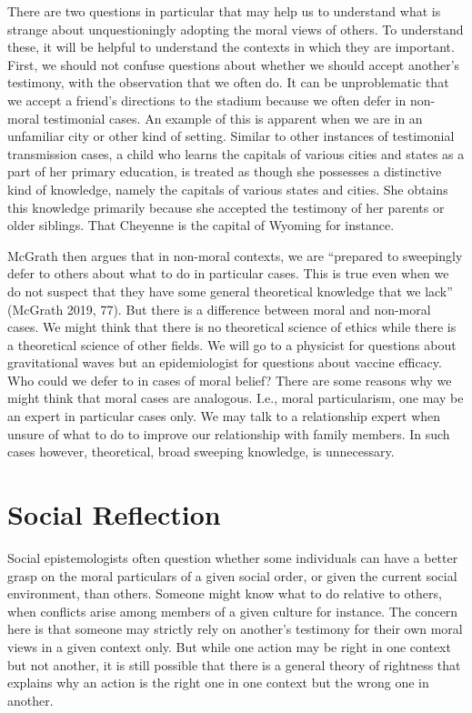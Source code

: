 \documentclass[12pt]{book}
\theoremstyle{definition}
\theoremstyle{remark}
\begin{document}
There are two questions in particular that may help us to understand what is strange about unquestioningly adopting the moral views of others. To understand these, it will be helpful to understand the contexts in which they are important. First, we should not confuse questions about whether we should accept another's testimony, with the observation that we often do. It can be unproblematic that we accept a friend's directions to the stadium because we often defer in non-moral testimonial cases. An example of this is apparent when we are in an unfamiliar city or other kind of setting. Similar to other instances of testimonial transmission cases, a child who learns the capitals of various cities and states as a part of her primary education, is treated as though she possesses a distinctive kind of knowledge, namely the capitals of various states and cities. She obtains this knowledge primarily because she accepted the testimony of her parents or older siblings. That Cheyenne is the capital of Wyoming for instance.

McGrath then argues that in non-moral contexts, we are ``prepared to sweepingly defer to others about what to do in particular cases. This is true even when we do not suspect that they have some general theoretical knowledge that we lack'' (McGrath 2019, 77). But there is a difference between moral and non-moral cases. We might think that there is no theoretical science of ethics while there is a theoretical science of other fields. We will go to a physicist for questions about gravitational waves but an epidemiologist for questions about vaccine efficacy. Who could we defer to in cases of moral belief? There are some reasons why we might think that moral cases are analogous. I.e., moral particularism, one may be an expert in particular cases only. We may talk to a relationship expert when unsure of what to do to improve our relationship with family members. In such cases however, theoretical, broad sweeping knowledge, is unnecessary.

\section{Social Reflection}\label{social-reflection}

Social epistemologists often question whether some individuals can have a better grasp on the moral particulars of a given social order, or given the current social environment, than others. Someone might know what to do relative to others, when conflicts arise among members of a given culture for instance. The concern here is that someone may strictly rely on another's testimony for their own moral views in a given context only. But while one action may be right in one context but not another, it is still possible that there is a general theory of rightness that explains why an action is the right one in one context but the wrong one in another.
\end{document}
